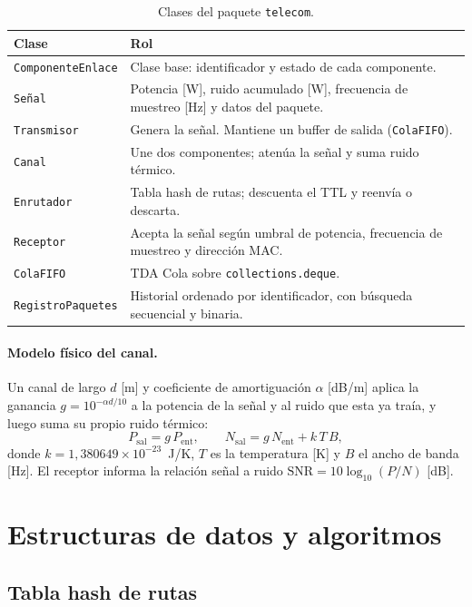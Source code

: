 \documentclass[11pt,a4paper]{article}
\begin{document}
\begin{table}[h]
\centering
\caption{Clases del paquete \texttt{telecom}.}
\label{tab:clases}
\begin{tabular}{lp{10.5cm}}
\toprule
Clase & Rol \\
\midrule
\texttt{ComponenteEnlace} & Clase base: identificador y estado de cada componente. \\
\texttt{Señal} & Potencia [W], ruido acumulado [W], frecuencia de muestreo [Hz] y datos del paquete. \\
\texttt{Transmisor} & Genera la señal. Mantiene un buffer de salida (\texttt{ColaFIFO}). \\
\texttt{Canal} & Une dos componentes; atenúa la señal y suma ruido térmico. \\
\texttt{Enrutador} & Tabla hash de rutas; descuenta el TTL y reenvía o descarta. \\
\texttt{Receptor} & Acepta la señal según umbral de potencia, frecuencia de muestreo y dirección MAC. \\
\texttt{ColaFIFO} & TDA Cola sobre \texttt{collections.deque}. \\
\texttt{RegistroPaquetes} & Historial ordenado por identificador, con búsqueda secuencial y binaria. \\
\bottomrule
\end{tabular}
\end{table}

\paragraph{Modelo físico del canal.} Un canal de largo $d$ [m] y coeficiente de
amortiguación $\alpha$ [dB/m] aplica la ganancia $g = 10^{-\alpha d/10}$ a la
potencia de la señal y al ruido que esta ya traía, y luego suma su propio ruido
térmico:
\begin{equation}
P_{\text{sal}} = g\,P_{\text{ent}}, \qquad
N_{\text{sal}} = g\,N_{\text{ent}} + k\,T\,B,
\end{equation}
donde $k = 1{,}380649\times10^{-23}$~J/K, $T$ es la temperatura [K] y $B$ el
ancho de banda [Hz]. El receptor informa la relación señal a ruido
$\text{SNR} = 10\log_{10}(P/N)$ [dB].

\section{Estructuras de datos y algoritmos}

\subsection{Tabla hash de rutas}
\end{document}
